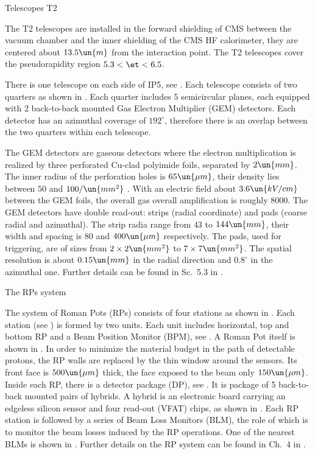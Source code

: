 \caption{Telescopes T2}

The T2 telescopes are installed in the forward shielding of CMS between the vacuum chamber and the inner shielding of the CMS HF calorimeter, they are centered about $13.5\un{m}$ from the interaction point. The T2 telescopes cover the pseudorapidity region $5.3 < \et < 6.5$.

There is one telescope on each side of IP5, see . Each telescope consists of two quarters as shown in . Each quarter includes 5 semicircular planes, each equipped with 2 back-to-back mounted Gas Electron Multiplier (GEM) detectors. Each detector has an azimuthal coverage of $192^\circ$, therefore there is an overlap between the two quarters within each telescope.

The GEM detectors are gaseous detectors where the electron multiplication is realized by three perforated Cu-clad polyimide foils, separated by $2\un{mm}$. The inner radius of the perforation holes is $65\un{\mu m}$, their density lies between $50$ and $100/\un{mm^2}$ . With an electric field about $3.6 \un{kV/cm}$ between the GEM foils, the overall gas overall amplification is roughly $8000$. The GEM detectors have double read-out: strips (radial coordinate) and pads (coarse radial and azimuthal). The strip radia range from $43$ to $144\un{mm}$, their width and spacing is $80$ and $400\un{\mu m}$ respectively. The pads, used for triggering, are of sizes from $2\times 2\un{mm^2}$ to $7\times 7\un{mm^2}$. The spatial resolution is about $0.15\un{mm}$ in the radial direction and $0.8^\circ$ in the azimuthal one. Further details can be found in Sc.~5.3 in .



\bmfig
{}
\emfig


\caption{The RPs system}

The system of Roman Pots (RPs) consists of four stations as shown in . Each station (see ) is formed by two units. Each unit includes horizontal, top and bottom RP and a Beam Position Monitor (BPM), see . A Roman Pot itself is shown in . In order to minimize the material budget in the path of detectable protons, the RP walls are replaced by the thin window around the sensors. Its front face is $500\un{\mu m}$ thick, the face exposed to the beam only $150\un{\mu m}$. Inside each RP, there is a detector package (DP), see . It is package of 5 back-to-back mounted pairs of hybrids. A hybrid is an electronic board carrying an edgeless silicon sensor and four read-out (VFAT) chips, as shown in . Each RP station is followed by a series of Beam Loss Monitors (BLM), the role of which is to monitor the beam losses induced by the RP operations. One of the nearest BLMs is shown in . Further details on the RP system can be found in Ch.~4 in .

